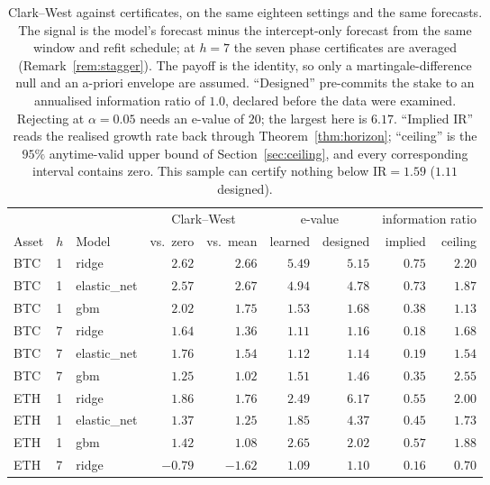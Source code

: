 \documentclass{article}
\theoremstyle{plain}
\theoremstyle{definition}
\begin{document}
\begin{table}[t]
  \centering
  \caption{Clark--West against certificates, on the same eighteen settings and the same
  forecasts. The signal is the model's forecast minus the intercept-only forecast from the
  same window and refit schedule; at $h=7$ the seven phase certificates are averaged
  (Remark~\ref{rem:stagger}). The payoff is the identity, so only a
  martingale-difference null and an a-priori envelope are assumed. ``Designed'' pre-commits
  the stake to an annualised information ratio of $1.0$, declared before the data were
  examined. Rejecting at $\alpha=0.05$ needs an e-value of $20$; the largest here is $6.17$. ``Implied
  $\mathrm{IR}$'' reads the realised growth rate back through
  Theorem~\ref{thm:horizon}; ``ceiling'' is the $95\%$ anytime-valid upper bound of
  Section~\ref{sec:ceiling}, and every corresponding interval contains zero. This sample can
  certify nothing below $\mathrm{IR}=1.59$ ($1.11$ designed).}
  \label{tab:cert}
  \small
  \begin{tabular}{lllrrrrrr}
    \toprule
    & & & \multicolumn{2}{c}{Clark--West} & \multicolumn{2}{c}{e-value}
    & \multicolumn{2}{c}{information ratio} \\
    \cmidrule(lr){4-5}\cmidrule(lr){6-7}\cmidrule(lr){8-9}
    Asset & $h$ & Model & vs.\ zero & vs.\ mean & learned & designed & implied & ceiling \\
    \midrule
    BTC & 1 & ridge & $2.62$ & $2.66$ & $5.49$ & $5.15$ & $0.75$ & $2.20$ \\
    BTC & 1 & elastic\_net & $2.57$ & $2.67$ & $4.94$ & $4.78$ & $0.73$ & $1.87$ \\
    BTC & 1 & gbm & $2.02$ & $1.75$ & $1.53$ & $1.68$ & $0.38$ & $1.13$ \\
    BTC & 7 & ridge & $1.64$ & $1.36$ & $1.11$ & $1.16$ & $0.18$ & $1.68$ \\
    BTC & 7 & elastic\_net & $1.76$ & $1.54$ & $1.12$ & $1.14$ & $0.19$ & $1.54$ \\
    BTC & 7 & gbm & $1.25$ & $1.02$ & $1.51$ & $1.46$ & $0.35$ & $2.55$ \\
    ETH & 1 & ridge & $1.86$ & $1.76$ & $2.49$ & $6.17$ & $0.55$ & $2.00$ \\
    ETH & 1 & elastic\_net & $1.37$ & $1.25$ & $1.85$ & $4.37$ & $0.45$ & $1.73$ \\
    ETH & 1 & gbm & $1.42$ & $1.08$ & $2.65$ & $2.02$ & $0.57$ & $1.88$ \\
    ETH & 7 & ridge & $-0.79$ & $-1.62$ & $1.09$ & $1.10$ & $0.16$ & $0.70$ \\

\end{tabular}
\end{table}
\end{document}
